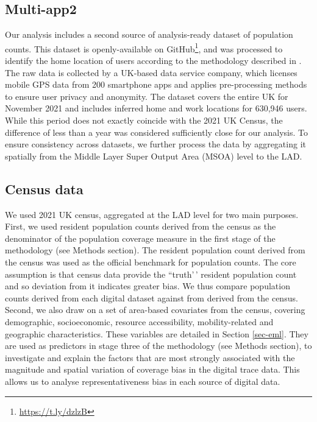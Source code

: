 \documentclass[]{rsos}%
\begin{document}
\subsection{Multi-app2}\label{multi-app2}

Our analysis includes a second source of analysis-ready dataset of
population counts. This dataset is openly-available on GitHub\footnote{\url{https://t.ly/dzlzB}}, and was processed to
identify the home location of users according to the methodology
described in \citep{zhong24working}. The raw data is collected by a UK-based
data service company, which licenses mobile GPS data from 200 smartphone
apps and applies pre-processing methods to ensure user privacy and
anonymity. The dataset covers the entire UK for November 2021 and
includes inferred home and work locations for 630,946 users. While this
period does not exactly coincide with the 2021 UK Census, the difference
of less than a year was considered sufficiently close for our analysis.
To ensure consistency across datasets, we further process the data by
aggregating it spatially from the Middle Layer Super Output Area (MSOA)
level to the LAD.

\subsection{Census data}\label{census-data}

We used 2021 UK census, aggregated at the LAD level for two main
purposes. First, we used resident population counts derived from the
census as the denominator of the population coverage measure in the
first stage of the methodology (see Methods section). The resident
population count derived from the census was used as the official
benchmark for population counts. The core assumption is that census data provide the ``truth'\,'
resident population count and so deviation from it indicates greater bias. We thus compare population
counts derived from each digital dataset against from derived from the census.
Second, we also draw on a set
of area-based covariates from the census, covering demographic,
socioeconomic, resource accessibility, mobility-related and geographic
characteristics. These variables are detailed in Section \ref{sec-eml}. They are used as predictors in stage three of the
methodology (see Methods section), to investigate and explain the
factors that are most strongly associated with the magnitude and spatial
variation of coverage bias in the digital trace data. This allows us to
analyse representativeness bias in each source of digital data.
\end{document}
